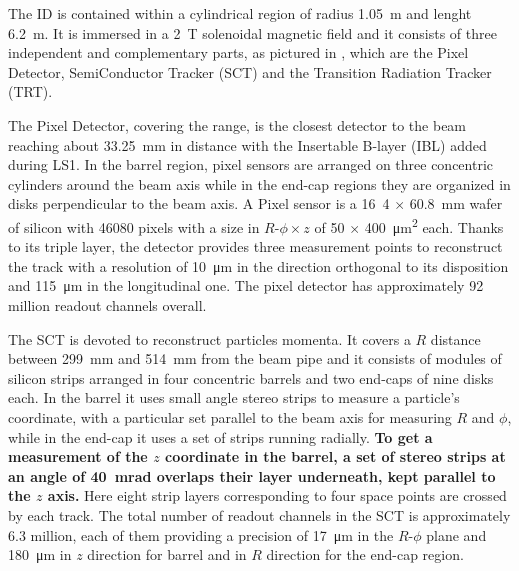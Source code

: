 The ID is contained within a cylindrical region of radius \SI{1.05}{\m} and lenght \SI{6.2}{\m}. It is immersed in a \SI{2}{\tesla} solenoidal magnetic field and it consists of three independent and complementary parts, as pictured in \Fig{\ref{fig:xsecID}}, which are the Pixel Detector, SemiConductor Tracker (SCT) and the Transition Radiation Tracker (TRT).

The Pixel Detector, covering the  range, is the closest detector to the beam reaching about \SI{33.25}{\mm} in distance with the Insertable B-layer (IBL) added during LS1. In the barrel region, pixel sensors are arranged on three concentric cylinders around the beam axis while in the end-cap regions they are organized in disks perpendicular to the beam axis. A Pixel sensor is a \si{16.4} $\times$ \SI{60.8}{\mm} wafer of silicon with \num{46080} pixels with a size in $R$-$\phi \times z$ of  \si{50} $\times$ \SI{400}{\um\squared} each. Thanks to its triple layer, the detector provides three measurement points to reconstruct the track with a resolution of \SI{10}{\um} in the direction orthogonal to its disposition and \SI{115}{\um} in the longitudinal one. The pixel detector has approximately \num{92} million readout channels overall.

The SCT is devoted to reconstruct particles momenta. It covers a $R$ distance between \SI{299}{\mm} and \SI{514}{\mm}  from the beam pipe and it consists of modules of silicon strips arranged in four concentric barrels and two end-caps of nine disks each. In the barrel it uses small angle stereo strips to measure a particle's coordinate, with a particular set parallel to the beam axis for measuring $R$ and $\phi$, while in the end-cap it uses a set of strips running radially. 
{\bfseries To get a measurement of the $z$ coordinate in the barrel, a set of stereo strips at an angle of \SI{40}{mrad} overlaps their layer underneath, kept parallel to the $z$ axis.}
Here eight strip layers corresponding to four space points are crossed by each track. The total number of readout channels in the SCT is approximately 6.3 million, each of them providing a precision of \SI{17}{\um} in the $R$-$\phi$ plane and \SI{180}{\um} in $z$ direction for barrel and in $R$ direction for the end-cap region.


